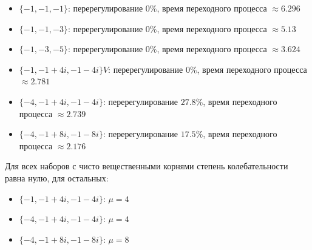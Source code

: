 \begin{itemize}
\setlength{\itemsep}{-1ex}
   \item{\begin{flushleft} $\lbrace -1,-1,-1\rbrace$: перерегулирование $0\%$, время переходного процесса $\approx 6.296$ \end{flushleft}}
   \item{\begin{flushleft} $\lbrace -1,-1,-3\rbrace$: перерегулирование $0\%$, время переходного процесса $\approx 5.13$ \end{flushleft}}
   \item{\begin{flushleft} $\lbrace -1,-3,-5\rbrace$: перерегулирование $0\%$, время переходного процесса $\approx 3.624$ \end{flushleft}}
   \item{\begin{flushleft} $\lbrace -1,-1+4i,-1-4i\rbrace V$: перерегулирование $0\%$, время переходного процесса $\approx 2.781$ \end{flushleft}}
   \item{\begin{flushleft} $\lbrace -4,-1+4i,-1-4i\rbrace$: перерегулирование $27.8\%$, время переходного процесса $\approx 2.739$ \end{flushleft}}
   \item{\begin{flushleft} $\lbrace -4,-1+8i,-1-8i\rbrace$: перерегулирование $17.5\%$, время переходного процесса $\approx 2.176$ \end{flushleft}}
\end{itemize}

\begin{par}
\begin{flushleft}
Для всех наборов с чисто вещественными корнями степень колебательности равна нулю, для остальных:
\end{flushleft}
\end{par}

\begin{itemize}
\setlength{\itemsep}{-1ex}
   \item{\begin{flushleft} $\lbrace -1,-1+4i,-1-4i\rbrace$: $\mu =4$ \end{flushleft}}
   \item{\begin{flushleft} $\lbrace -4,-1+4i,-1-4i\rbrace$: $\mu =4$ \end{flushleft}}
   \item{\begin{flushleft} $\lbrace -4,-1+8i,-1-8i\rbrace$: $\mu =8$ \end{flushleft}}
\end{itemize}


